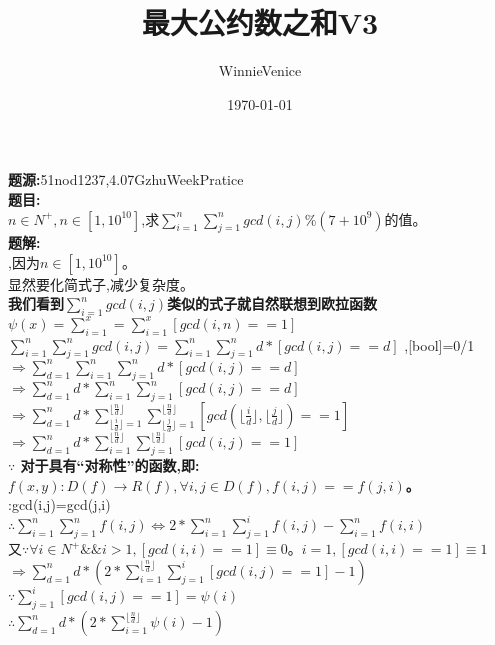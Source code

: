 \documentclass[UTF8]{ctexart}
\begin{document}
\title{最大公约数之和V3}
\date{\today}
\author{WinnieVenice}
\maketitle
\noindent\textbf{题源:}51nod1237,4.07GzhuWeekPratice
\\\textbf{题目:}
\\$n\in N^+,n\in[1,10^{10}]$,求$\sum\limits_{i=1}^n\sum\limits_{j=1}^n gcd(i,j) \% (7+10^9)$的值。
\\\textbf{题解:}
\\,因为$n\in[1,10^{10}]$。
\\显然要化简式子,减少复杂度。
\\\indent\textbf{我们看到$\sum_{i=1}^n gcd(i,j)$类似的式子就自然联想到欧拉函数$\psi(x)=\sum_{i=1}^x=\sum_{i=1}^x [gcd(i,n)==1]$} 
\\$\sum\limits_{i=1}^n\sum\limits_{j=1}^n gcd(i,j)=\sum\limits_{i=1}^n\sum\limits_{j=1}^n d*[gcd(i,j)==d]$ ,[bool]=0/1 
\\$\Rightarrow\sum\limits_{d=1}^n\sum\limits_{i=1}^n\sum\limits_{j=1}^n d*[gcd(i,j)==d]$
\\$\Rightarrow\sum\limits_{d=1}^n d*\sum\limits_{i=1}^n\sum\limits_{j=1}^n [gcd(i,j)==d]$
\\$\Rightarrow\sum\limits_{d=1}^n d*\sum\limits_{\lfloor\frac{i}{d}\rfloor=1}^{\lfloor\frac{n}{d}\rfloor}\sum\limits_{\lfloor\frac{j}{d}\rfloor=1}^{\lfloor\frac{n}{d}\rfloor} [gcd(\lfloor\frac{i}{d}\rfloor,\lfloor\frac{j}{d}\rfloor)==1]$
\\$\Rightarrow\sum\limits_{d=1}^n d*\sum\limits_{i=1}^{\lfloor\frac{n}{d}\rfloor}\sum\limits_{j=1}^{\lfloor\frac{n}{d}\rfloor}[gcd(i,j)==1]$
\\\textbf{$\because$ 对于具有“对称性”的函数,即:$f(x,y):D(f)\rightarrow R(f),\forall i,j\in D(f),f(i,j)==f(j,i)$。}
\\:gcd(i,j)=gcd(j,i)
\\$\therefore \sum\limits_{i=1}^n\sum\limits_{j=1}^n f(i,j) \Leftrightarrow 2*\sum\limits_{i=1}^n\sum\limits_{j=1}^i f(i,j)-\sum_{i=1}^n f(i,i)$
\\又$\because\forall i\in N^+\&\&i>1,[gcd(i,i)==1]\equiv0$。$i=1,[gcd(i,i)==1]\equiv1$
\\$\Rightarrow\sum\limits_{d=1}^n d*(2*\sum\limits_{i=1}^{\lfloor\frac{n}{d}\rfloor}\sum\limits_{j=1}^i [gcd(i,j)==1]-1)$
\\$\because \sum_{j=1}^i [gcd(i,j)==1]=\psi(i)$
\\$\therefore\sum\limits_{d=1}^n d*(2*\sum\limits_{i=1}^{\lfloor\frac{n}{d}\rfloor}\psi(i)-1)$
\end{document}
